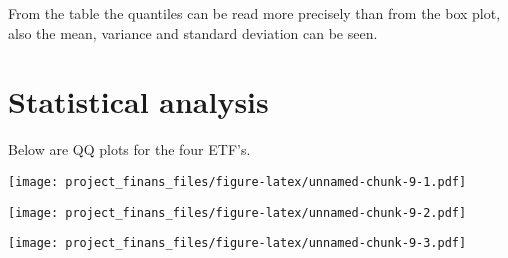 \documentclass[
]{article}
\newenvironment{Shaded}{\begin{snugshade}}{\end{snugshade}}
\newcommand{\AttributeTok}[1]{\textcolor[rgb]{0.77,0.63,0.00}{#1}}
\newcommand{\FunctionTok}[1]{\textcolor[rgb]{0.00,0.00,0.00}{#1}}
\newcommand{\NormalTok}[1]{#1}
\newcommand{\SpecialCharTok}[1]{\textcolor[rgb]{0.00,0.00,0.00}{#1}}
\newcommand{\StringTok}[1]{\textcolor[rgb]{0.31,0.60,0.02}{#1}}
\begin{document}
From the table the quantiles can be read more precisely than from the
box plot, also the mean, variance and standard deviation can be seen.

\section{Statistical analysis}

Below are QQ plots for the four ETF's.

\begin{Shaded}
\end{Shaded}

\texttt{[image: project\_finans\_files/figure-latex/unnamed-chunk-9-1.pdf]}

\begin{Shaded}
\end{Shaded}

\texttt{[image: project\_finans\_files/figure-latex/unnamed-chunk-9-2.pdf]}

\begin{Shaded}
\end{Shaded}

\texttt{[image: project\_finans\_files/figure-latex/unnamed-chunk-9-3.pdf]}

\begin{Shaded}
\end{Shaded}
\end{document}
